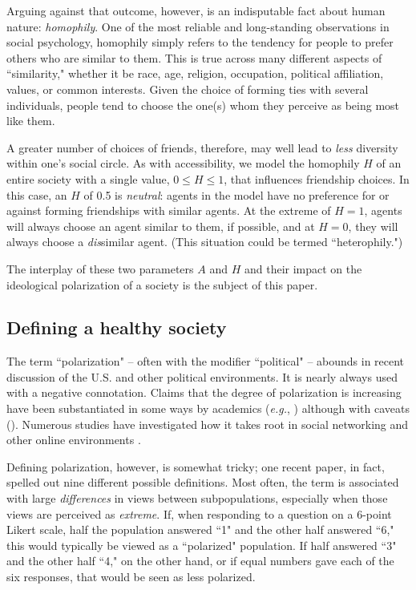 Arguing against that outcome, however, is an indisputable fact about human
nature: \textit{homophily}. One of the most reliable and long-standing
observations in social psychology, homophily simply refers to the tendency for
people to prefer others who are similar to them.\cite{mcpherson_birds_2001}
This is true across many different aspects of ``similarity," whether it be
race, age, religion, occupation, political affiliation, values, or common
interests. Given the choice of forming ties with several individuals, people
tend to choose the one(s) whom they perceive as being most like them. 

A greater number of choices of friends, therefore, may well lead to
\textit{less} diversity within one's social circle. As with accessibility, we
model the homophily $H$ of an entire society with a single value, $0 \leq H
\leq 1$, that influences friendship choices. In this case, an $H$ of 0.5 is
\textit{neutral}: agents in the model have no preference for or against
forming friendships with similar agents. At the extreme of $H=1$, agents will
always choose an agent similar to them, if possible, and at $H=0$, they will
always choose a \textit{dis}similar agent. (This situation could be termed
``heterophily.")

The interplay of these two parameters $A$ and $H$ and their impact on the
ideological polarization of a society is the subject of this paper.

\subsection{Defining a healthy society}

The term ``polarization" -- often with the modifier ``political" -- abounds in
recent discussion of the U.S. and other political
env\-ironments\cite{campbell_source_2016,french_were_2017,dimock_political_2014,mccarty_polarized_2016}.
It is nearly always used with a negative connotation. Claims that the degree
of polarization is increasing have been substantiated in some ways by
academics (\textit{e.g.},
\cite{baldassarri_partisans_2008,prior_media_2013,abramowitz_new_2015})
although with caveats
(\cite{baldassarri_dynamics_2007,fiorina_political_2008,abrams_party_2015}). Numerous studies
have investigated how it takes root in social networking and other online
environments
\cite{mousavi_role_2014,conover_political_2011,adamic_political_2005,hargittai_cross-ideological_2008}.

Defining polarization, however, is somewhat tricky; one recent paper, in fact,
spelled out nine different possible
definitions\cite{bramson_disambiguation_2016}. Most often, the term is
associated with large \textit{differences} in views between subpopulations,
especially when those views are perceived as \textit{extreme}. If, when
responding to a question on a 6-point Likert scale, half the population
answered ``1" and the other half answered ``6," this would typically be viewed
as a ``polarized" population. If half answered ``3" and the other half ``4,"
on the other hand, or if equal numbers gave each of the six responses, that
would be seen as less polarized.

